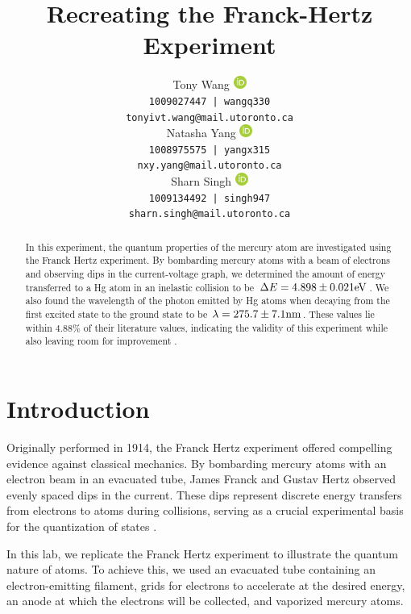 \documentclass[12pt]{article}
\title{Recreating the Franck-Hertz Experiment}
\author{
Tony Wang \href{https://orcid.org/0009-0009-3015-7192}{\includegraphics[height=12pt]{figure/orcid.png}}\\
\texttt{1009027447 | wangq330} \\
\texttt{tonyivt.wang@mail.utoronto.ca}\\
\And
Natasha Yang \href{https://orcid.org/12345}{\includegraphics[height=12pt]{figure/orcid.png}}\\
\texttt{1008975575 | yangx315} \\
\texttt{nxy.yang@mail.utoronto.ca} \\
\And
Sharn Singh \href{https://orcid.org/12345}{\includegraphics[height=12pt]{figure/orcid.png}}\\
\texttt{1009134492 | singh947} \\
\texttt{sharn.singh@mail.utoronto.ca} \\
}
\begin{document}
\maketitle
\begin{abstract}
In this experiment, the quantum properties of the mercury atom are investigated using the Franck Hertz experiment. By bombarding mercury atoms with a beam of electrons and observing dips in the current-voltage graph, we determined the amount of energy transferred to a Hg atom in an inelastic collision to be $\Delta E = 4.898 \pm 0.021 \rm eV$. We also found the wavelength of the photon emitted by Hg atoms when decaying from the first excited state to the ground state to be $\lambda = 275.7 \pm 7.1 \rm nm$. These values lie within $4.88\%$ of their literature values, indicating the validity of this experiment while also leaving room for improvement \autocite{hanne1988}.
\end{abstract}

\section{Introduction}
Originally performed in 1914, the Franck Hertz experiment offered compelling evidence against classical mechanics. By bombarding mercury atoms with an electron beam in an evacuated tube, James Franck and Gustav Hertz observed evenly spaced dips in the current. These dips represent discrete energy transfers from electrons to atoms during collisions, serving as a crucial experimental basis for the quantization of states \autocite{manuall}.

In this lab, we replicate the Franck Hertz experiment to illustrate the quantum nature of atoms. To achieve this, we used an evacuated tube containing an electron-emitting filament, grids for electrons to accelerate at the desired energy, an anode at which the electrons will be collected, and vaporized mercury atoms. 
\end{document}
